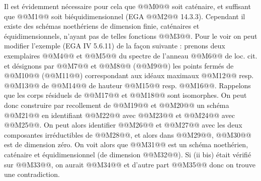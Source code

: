 

Il est
évidemment nécessaire pour cela que @@M0@@ soit caténaire, et suffisant que @@M1@@ soit biéquidimensionnel (EGA @@M2@@ 14.3.3). Cependant il existe des schémas noethériens de dimension finie, caténaires et équidimensionnels, n'ayant pas de telles fonctions @@M3@@. Pour le voir on peut modifier l'exemple (EGA IV 5.6.11) de la façon suivante : prenons deux exemplaires @@M4@@ et @@M5@@ du spectre de l'anneau @@M6@@ de loc. cit. et désignons par @@M7@@ et @@M8@@ (@@M9@@) les points fermés de @@M10@@ (@@M11@@) correspondant aux idéaux maximaux @@M12@@ resp. @@M13@@ de @@M14@@ de hauteur @@M15@@ resp. @@M16@@. Rappelons que les corps résiduels de @@M17@@ et @@M18@@ sont isomorphes. On peut donc construire par recollement de @@M19@@ et @@M20@@ un schéma @@M21@@ en identifiant @@M22@@ avec @@M23@@ et @@M24@@ avec @@M25@@. On peut alors identifier @@M26@@ et @@M27@@ avec les deux composantes irréductibles de @@M28@@, et alors dans @@M29@@, @@M30@@ est de dimension zéro. On voit alors que @@M31@@ est un schéma noethérien, caténaire et équidimensionnel (de dimension @@M32@@). Si (ii bis) était vérifié sur @@M33@@, on aurait
@@M34@@
et d'autre part
@@M35@@
donc on trouve une contradiction.

